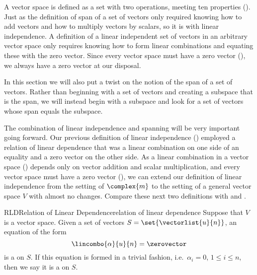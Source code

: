 %
A vector space is defined as a set with two operations, meeting ten properties ().  Just as the definition of span of a set of vectors only required knowing how to add vectors and how to multiply vectors by scalars, so it is with linear independence.  A definition of a linear independent set of vectors in an arbitrary vector space only requires knowing how to form linear combinations and equating these with the zero vector.  Since every vector space must have a zero vector (), we always have a zero vector at our disposal.\par
%
In this section we will also put a twist on the notion of the span of a set of vectors.  Rather than beginning with a set of vectors and creating a subspace that is the span, we will instead begin with a subspace and look for a set of vectors whose span equals the subspace.\par
%
The combination of linear independence and spanning will be very important going forward.
%
%
Our previous definition of linear independence () employed a relation of linear dependence that was a linear combination on one side of an equality and a zero vector on the other side.  As a linear combination in a vector space () depends only on vector addition and scalar multiplication, and every vector space must have a zero vector (), we can extend our definition of linear independence from the setting of $\complex{m}$ to the setting of a general vector space $V$ with almost no changes.  Compare these next two definitions with  and .
%
\begin{definition}{RLD}{Relation of Linear Dependence}{relation of linear dependence}
Suppose that $V$ is a vector space.
Given a set of vectors $S=\set{\vectorlist{u}{n}}$, an equation of the form
%
\begin{equation*}
\lincombo{\alpha}{u}{n}=\zerovector
\end{equation*}
%
is a  on $S$.  If this equation is formed in a trivial fashion, i.e.\ $\alpha_i=0$, $1\leq i\leq n$, then we say it is a  on $S$.
%
\end{definition}
